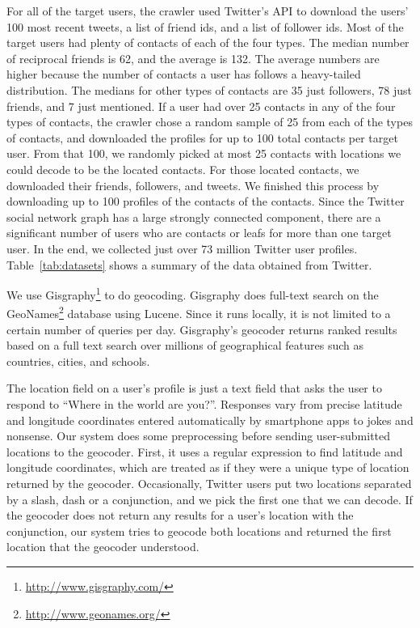 For all of the target users, the crawler used Twitter's API to download
the users' 100 most recent tweets, a list of friend ids, and a list of follower ids.
%
Most of the target users had plenty of contacts of each of the four types.
%
The median number of reciprocal friends is 62, and the average is 132.
%
The average numbers are higher because the number of contacts a user has
follows a heavy-tailed distribution.
%
The medians for other types of contacts are 35 just followers, 78 just friends,
and 7 just mentioned.
%
If a user had over 25 contacts in any of the four types of contacts, the
crawler chose a random sample of 25 from each of the types of contacts, and
downloaded the profiles for up to 100 total contacts per target user.
%
From that 100, we randomly picked at most 25 contacts with locations we could
decode to be the located contacts. For those located contacts, we downloaded
their friends, followers, and tweets.
%
We finished this process by downloading up to 100 profiles of the contacts of
the contacts.
%
Since the Twitter social network graph has a large strongly connected
component, there are a significant number of users who are contacts or leafs for
more than one target user.
%
In the end, we collected just over 73 million Twitter user profiles.
%
Table~\ref{tab:datasets} shows a summary of the data obtained from Twitter.

We use Gisgraphy\footnote{\url{http://www.gisgraphy.com/}} to do geocoding.
%
Gisgraphy does full-text search on the
GeoNames\footnote{\url{http://www.geonames.org/}} database using Lucene.
%
Since it runs locally, it is not limited to a certain number of queries per day.
%
Gisgraphy's geocoder returns ranked results based on a full text search
over millions of geographical features such as countries, cities, and schools.

The location field on a user's profile is just a text field that asks the user
to respond to ``Where in the world are you?''.
%
Responses vary from precise latitude and longitude coordinates entered
automatically by smartphone apps to jokes and nonsense.
%
Our system does some preprocessing before sending user-submitted locations to
the geocoder.
%
First, it uses a regular expression to find latitude and longitude coordinates,
which are treated as if they were a unique type of location returned by the
geocoder.
%
Occasionally, Twitter users put two locations separated by a slash, dash or a
conjunction, and we pick the first one that we can decode.
%
If the geocoder does not return any results for a user's location with the
conjunction, our system tries to geocode both locations and returned the first
location that the geocoder understood.

